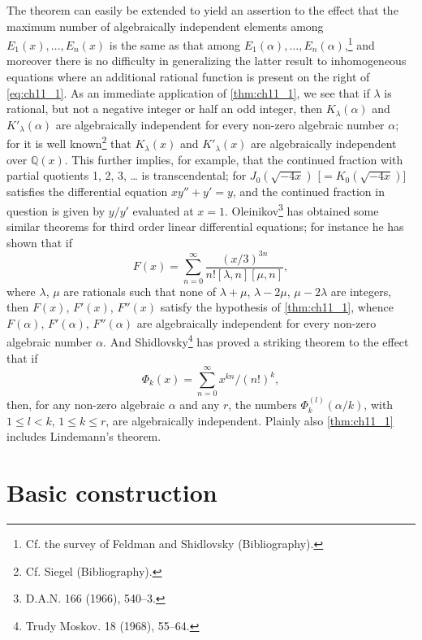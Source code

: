 The theorem can easily be extended to yield an assertion to the effect that the maximum number of algebraically independent elements among $E_1(x), \ldots, E_n(x)$ is the same as that among $E_1(\alpha), \ldots, E_n(\alpha)$,\footnote{Cf. the survey of Feldman and Shidlovsky (Bibliography).} and moreover there is no difficulty in generalizing the latter result to inhomogeneous equations where an additional rational function is present on the right of \eqref{eq:ch11_1}. As an immediate application of \autoref{thm:ch11_1}, we see that if $\lambda$ is rational, but not a negative integer or half an odd integer, then $K_{\lambda}(\alpha)$ and $K'_{\lambda}(\alpha)$ are algebraically independent for every non-zero algebraic number $\alpha$; for it is well known\footnote{Cf. Siegel (Bibliography).} that $K_{\lambda}(x)$ and $K'_{\lambda}(x)$ are algebraically independent over $\mathbb{Q}(x)$. This further implies, for example, that the continued fraction with partial quotients 1, 2, 3, \ldots{} is transcendental; for $J_0(\sqrt{-4x})$ [$= K_0(\sqrt{-4x})$] satisfies the differential equation $xy'' + y' = y$, and the continued fraction in question is given by $y/y'$ evaluated at $x = 1$. Oleinikov\footnote{D.A.N. 166 (1966), 540--3.} has obtained some similar theorems for third order linear differential equations; for instance he has shown that if
\[F(x) = \sum_{n=0}^{\infty} \frac{(x/3)^{3n}}{n! [\lambda, n] [\mu, n]},\]
where $\lambda$, $\mu$ are rationals such that none of $\lambda + \mu$, $\lambda - 2\mu$, $\mu - 2\lambda$ are integers, then $F(x)$, $F'(x)$, $F''(x)$ satisfy the hypothesis of \autoref{thm:ch11_1}, whence $F(\alpha)$, $F'(\alpha)$, $F''(\alpha)$ are algebraically independent for every non-zero algebraic number $\alpha$. And Shidlovsky\footnote{Trudy Moskov. 18 (1968), 55--64.} has proved a striking theorem to the effect that if
\[\Phi_k(x) = \sum_{n=0}^{\infty} x^{kn}/(n!)^k,\]
then, for any non-zero algebraic $\alpha$ and any $r$, the numbers $\Phi_k^{(l)}(\alpha/k)$, with $1 \leq l < k$, $1 \leq k \leq r$, are algebraically independent. Plainly also \autoref{thm:ch11_1} includes Lindemann's theorem.

\section{Basic construction}\label{sec:ch11_2}

